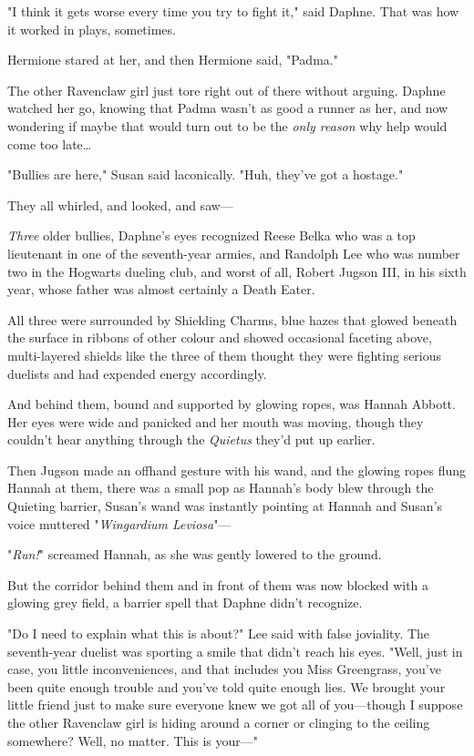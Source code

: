 "I think it gets worse every time you try to fight it," said Daphne. That was
how it worked in plays, sometimes.

Hermione stared at her, and then Hermione said, "Padma."

The other Ravenclaw girl just tore right out of there without arguing. Daphne
watched her go, knowing that Padma wasn't as good a runner as her, and now
wondering if maybe that would turn out to be the \emph{only reason} why help
would come too late{\ldots}

"Bullies are here," Susan said laconically. "Huh, they've got a hostage."

They all whirled, and looked, and saw---

\emph{Three} older bullies, Daphne's eyes recognized Reese Belka who was a top
lieutenant in one of the seventh-year armies, and Randolph Lee who was number
two in the Hogwarts dueling club, and worst of all, Robert Jugson III, in his
sixth year, whose father was almost certainly a Death Eater.

All three were surrounded by Shielding Charms, blue hazes that glowed beneath
the surface in ribbons of other colour and showed occasional faceting above,
multi-layered shields like the three of them thought they were fighting serious
duelists and had expended energy accordingly.

And behind them, bound and supported by glowing ropes, was Hannah Abbott. Her
eyes were wide and panicked and her mouth was moving, though they couldn't hear
anything through the \emph{Quietus} they'd put up earlier.

Then Jugson made an offhand gesture with his wand, and the glowing ropes flung
Hannah at them, there was a small pop as Hannah's body blew through the
Quieting barrier, Susan's wand was instantly pointing at Hannah and Susan's
voice muttered "\emph{Wingardium Leviosa}"---

"\emph{Run!}" screamed Hannah, as she was gently lowered to the ground.

But the corridor behind them and in front of them was now blocked with a
glowing grey field, a barrier spell that Daphne didn't recognize.

"Do I need to explain what this is about?" Lee said with false joviality. The
seventh-year duelist was sporting a smile that didn't reach his eyes. "Well,
just in case, you little inconveniences, and that includes you Miss Greengrass,
you've been quite enough trouble and you've told quite enough lies. We brought
your little friend just to make sure everyone knew we got all of you---though I
suppose the other Ravenclaw girl is hiding around a corner or clinging to the
ceiling somewhere? Well, no matter. This is your---"

